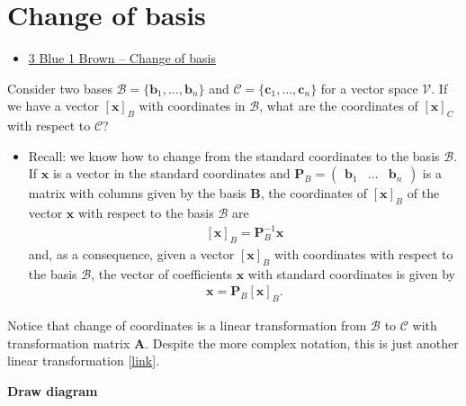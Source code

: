 \documentclass[
]{book}
\providecommand{\tightlist}{%
  \setlength{\itemsep}{0pt}\setlength{\parskip}{0pt}}
\theoremstyle{definition}
\theoremstyle{definition}
\theoremstyle{definition}
\theoremstyle{definition}
\theoremstyle{remark}
\begin{document}
\hypertarget{change-of-basis}{%
\chapter{Change of basis}\label{change-of-basis}}

\begin{itemize}
\tightlist
\item
  \href{https://www.3blue1brown.com/lessons/change-of-basis}{3 Blue 1 Brown -- Change of basis}
\end{itemize}

Consider two bases \(\mathcal{B} = \{ \mathbf{b}_1, \ldots, \mathbf{b}_n \}\) and \(\mathcal{C} = \{ \mathbf{c}_1, \ldots, \mathbf{c}_n \}\) for a vector space \(\mathcal{V}\). If we have a vector \(\left[\mathbf{x}\right]_B\) with coordinates in \(\mathcal{B}\), what are the coordinates of \(\left[\mathbf{x}\right]_C\) with respect to \(\mathcal{C}\)?

\begin{itemize}
\tightlist
\item
  Recall: we know how to change from the standard coordinates to the basis \(\mathcal{B}\). If \(\mathbf{x}\) is a vector in the standard coordinates and \(\mathbf{P}_B = \begin{pmatrix} \mathbf{b}_1 & \ldots & \mathbf{b}_n \end{pmatrix}\) is a matrix with columns given by the basis \(\mathbf{B}\), the coordinates of \(\left[\mathbf{x}\right]_B\) of the vector \(\mathbf{x}\) with respect to the basis \(\mathcal{B}\) are
  \[
  \begin{aligned}
  \left[\mathbf{x}\right]_B = \mathbf{P}_B^{-1} \mathbf{x}
  \end{aligned}
  \]
  and, as a consequence, given a vector \(\left[\mathbf{x}\right]_B\) with coordinates with respect to the basis \(\mathcal{B}\), the vector of coefficients \(\mathbf{x}\) with standard coordinates is given by
  \[
  \begin{aligned}
  \mathbf{x} = \mathbf{P}_B \left[\mathbf{x}\right]_B.
  \end{aligned}
  \]
\end{itemize}

Notice that change of coordinates is a linear transformation from \(\mathcal{B}\) to \(\mathcal{C}\) with transformation matrix \(\mathbf{A}\). Despite the more complex notation, this is just another linear transformation {[}\href{https://www.youtube.com/watch?v=VGhij2qmOs4}{link}{]}.

\textbf{Draw diagram}
\end{document}
